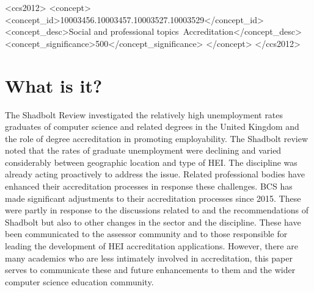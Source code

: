 \documentclass[sigconf]{acmart}
\begin{document}
\begin{CCSXML}
<ccs2012>
<concept>
<concept_id>10003456.10003457.10003527.10003529</concept_id>
<concept_desc>Social and professional topics~Accreditation</concept_desc>
<concept_significance>500</concept_significance>
</concept>
</ccs2012>
\end{CCSXML}




\maketitle
\section {What is it?}
The Shadbolt Review \cite{shadbolt2016shadbolt} investigated the relatively high unemployment rates graduates of computer science and related degrees in the United Kingdom and the role of degree accreditation in promoting employability. The Shadbolt review noted that the rates of graduate unemployment were declining and varied considerably between geographic location and type of HEI. The discipline was already acting proactively to address the issue.  Related professional bodies have enhanced their accreditation processes in response these challenges. BCS has made significant adjustments to their accreditation processes since 2015. These were partly in response to the discussions related to and the recommendations of Shadbolt but also to other changes in the sector and the discipline.  These have been communicated to the assessor community and to those responsible for leading the development of HEI accreditation applications. However, there are many academics who are less intimately involved in accreditation, this paper serves to communicate these and future enhancements to them and the wider computer science education community.
\end{document}
